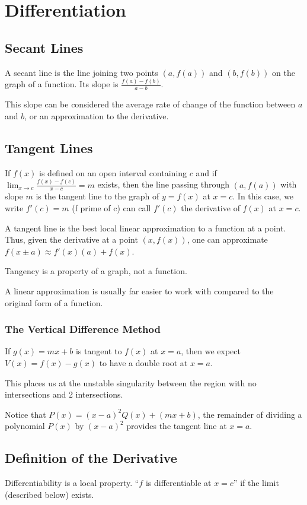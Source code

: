 \documentclass{article}
\begin{document}
\section{Differentiation}
\subsection{Secant Lines}
A secant line is the line joining two points $(a, f(a))$ and $(b, f(b))$ on the graph of a function. Its slope is $\frac{f(a)-f(b)}{a-b}$.

This slope can be considered the average rate of change of the function between $a$ and $b$, or an approximation to the derivative.


\subsection{Tangent Lines}
If $f(x)$ is defined on an open interval containing $c$ and if $\lim_{x\to c}\limits \frac{f(x) - f(c)}{x-c}=m$ exists, then the line passing through $(a, f(a))$ with slope $m$ is the tangent line to the graph of $y=f(x)$ at $x=c$. In this case, we write $f'(c) = m$ (f prime of c) can call $f'(c)$ the derivative of $f(x)$ at $x=c$.

A tangent line is the best local linear approximation to a function at a point. Thus, given the derivative at a point $(x, f(x))$, one can approximate $f(x\pm a) \approx f'(x)(a) + f(x)$.

Tangency is a property of a graph, not a function.

A linear approximation is usually far easier to work with compared to the original form of a function.

\subsubsection{The Vertical Difference Method}
If $g(x)=mx+b$ is tangent to $f(x)$ at $x=a$, then we expect $V(x) = f(x) - g(x)$ to have a double root at $x=a$.

This places us at the unstable singularity between the region with no intersections and 2 intersections.

Notice that $P(x) = (x-a)^2Q(x) + (mx+b)$, the remainder of dividing a polynomial $P(x)$ by $(x-a)^2$ provides the tangent line at $x=a$.
\subsection{Definition of the Derivative}
Differentiability is a local property. ``$f$ is differentiable at $x=c$'' if the limit (described below) exists.
\end{document}
